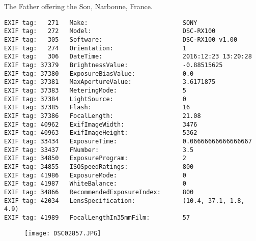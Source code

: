 \section{\protect{}}
\noindent The Father offering the Son, Narbonne, France.
\noindent
\begin{lstlisting}
EXIF tag:   271   Make:                          SONY
EXIF tag:   272   Model:                         DSC-RX100
EXIF tag:   305   Software:                      DSC-RX100 v1.00
EXIF tag:   274   Orientation:                   1
EXIF tag:   306   DateTime:                      2016:12:23 13:20:28
EXIF tag: 37379   BrightnessValue:               -0.88515625
EXIF tag: 37380   ExposureBiasValue:             0.0
EXIF tag: 37381   MaxApertureValue:              3.6171875
EXIF tag: 37383   MeteringMode:                  5
EXIF tag: 37384   LightSource:                   0
EXIF tag: 37385   Flash:                         16
EXIF tag: 37386   FocalLength:                   21.08
EXIF tag: 40962   ExifImageWidth:                3476
EXIF tag: 40963   ExifImageHeight:               5362
EXIF tag: 33434   ExposureTime:                  0.06666666666666667
EXIF tag: 33437   FNumber:                       3.5
EXIF tag: 34850   ExposureProgram:               2
EXIF tag: 34855   ISOSpeedRatings:               800
EXIF tag: 41986   ExposureMode:                  0
EXIF tag: 41987   WhiteBalance:                  0
EXIF tag: 34866   RecommendedExposureIndex:      800
EXIF tag: 42034   LensSpecification:             (10.4, 37.1, 1.8, 4.9)
EXIF tag: 41989   FocalLengthIn35mmFilm:         57

\end{lstlisting}
\clearpage
\begin{figure}
\raggedleft
\texttt{[image: DSC02857.JPG]}
\end{figure}


\clearpage
